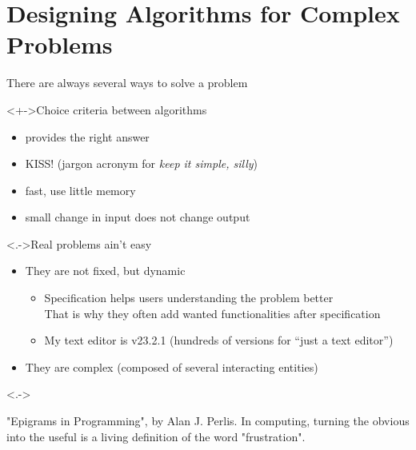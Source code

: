 \section{Designing Algorithms for Complex Problems}\sectionpage
\begin{frame}{There are always several ways to solve a problem}
  \begin{block}<+->{Choice criteria between algorithms}
    \begin{itemize}
    \item {} provides the right answer
    \item {}
      KISS! (jargon acronym for \textit{keep it simple, silly})
    \item {} fast, use little memory
    \item {} small change in input does not change output
    \end{itemize}
  \end{block}\vspace{-.5\baselineskip}

  \begin{block}<.->{Real problems ain't easy}
    \begin{itemize}
    \item They are not fixed, but \alert{dynamic}
      \begin{itemize}
      \item Specification helps users understanding the problem better\\
        That is why they often add wanted functionalities after specification
      \item My text editor is v23.2.1 
        {\small(hundreds of versions for ``just a text editor'')}
      \end{itemize}

    \item They are \alert{complex} (composed of several interacting entities)
    \end{itemize}
  \end{block}

  \visible<.->{
    \begin{boitequote}{\small"Epigrams in Programming", by Alan J. Perlis.}
      In computing, turning the obvious into the useful is a living definition
      of the word "frustration".
    \end{boitequote}
  }
\end{frame}
